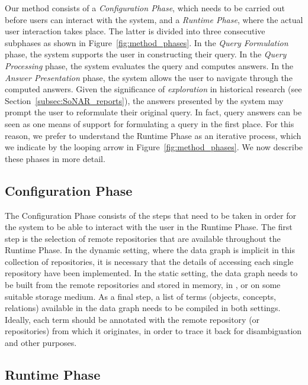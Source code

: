 Our method consists of a \emph{Configuration Phase}, which
needs to be carried out before users can interact with the system,
and a \emph{Runtime Phase}, where the actual user interaction takes place.
The latter is divided into three consecutive subphases as shown in Figure~\ref{fig:method_phases}.
In the \emph{Query Formulation} phase, the system supports the user 
in constructing their query.
In the \emph{Query Processing} phase, the system evaluates the query
and computes answers.
In the \emph{Answer Presentation} phase, the system allows the user to
navigate through the computed answers.
Given the significance of \emph{exploration} in historical research
(see Section~\ref{subsec:SoNAR_reports}),
the answers presented by the system may
prompt the user to reformulate their original query.
In fact, query answers can be seen as one means of support
for formulating a query in the first place.
For this reason, we prefer to understand the Runtime Phase as an iterative process,
which we indicate by the looping arrow in Figure~\ref{fig:method_phases}.
%
We now describe these phases in more detail.

\subsection{Configuration Phase}
\label{subsec:configuration_phase}

The Configuration Phase consists of the steps that need to be taken
in order for the system to be able to interact with the user in the Runtime Phase.
The first step is the selection of remote repositories that are available 
throughout the Runtime Phase.
In the dynamic setting, where the data graph is implicit in this collection of repositories,
it is necessary that the details of accessing each single repository
have been implemented.
In the static setting, the data graph needs to be built from the remote repositories
and stored in memory, in , or on some suitable storage medium.
As a final step, a list of terms (objects, concepts, relations) available in the data graph
needs to be compiled in both settings. Ideally, each term should be annotated with the remote repository
(or repositories)
from which it originates, in order to trace it back for disambiguation and
other purposes.

\subsection{Runtime Phase}

